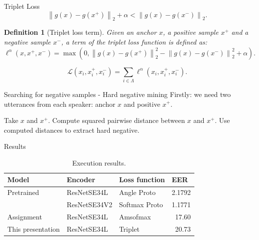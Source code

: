\documentclass[aspectratio=169]{beamer}
\newcommand{\norm}[1]{\left\lVert#1\right\rVert}
\newcommand{\ps}{x^+}
\newcommand{\ns}{x^-}
\newtheorem{defi}{Definition}
\begin{document}
\begin{frame}{Triplet Loss}
  \[
    \norm{g(x) - g(\ps)}_2 + \alpha < \norm{g(x) - g(\ns)}_2.
  \]
  \pause
  \begin{defi}[Triplet loss term]
    Given an anchor \(x\), a positive sample \(\ps\) and a negative sample \(\ns\), a term of the triplet loss function is defined as:
    \begin{equation}\label{triplet:single:loss}
      \ell^\alpha (x,\ps,\ns) = \max \left(0, \norm{g(x) - g(\ps)}_2^2 - \norm{g(x) - g(\ns)}_2^2 + \alpha\right).
    \end{equation}
  \end{defi}

  \begin{equation}\label{triplet:sum:loss}
    \mathcal L (x_i,\ps_i,\ns_i) = \sum_{i \in \Lambda} \ell^\alpha(x_i,\ps_i,\ns_i).
  \end{equation}
\end{frame}


\begin{frame}{Searching for negative samples - Hard negative mining}
  Firstly: we need two utterances from each speaker: anchor \(x\) and positive \(\ps\).
  \begin{algorithm}[H]
    \begin{algorithmic}[1]
      \STATE Take \(x\) and \(\ps\).
      \STATE Compute squared pairwise distance between \(x\) and \(\ps\).
      \STATE Use computed distances to extract hard negative.
      \ENDFOR
    \end{algorithmic}
    \caption{Hard negative mining }
    \label{alg:seq}
  \end{algorithm}

\end{frame}

\begin{frame}{Results}
  \begin{table}[H]
    \begin{tabular}{l|llr}
      Model             & Encoder      & Loss function & \multicolumn{1}{l}{EER}    \\ \hline
      Pretrained        & ResNetSE34L  & Angle Proto   & \multicolumn{1}{l}{2.1792} \\
                        & ResNetSE34V2 & Softmax Proto & 1.1771                     \\
      Assignment        & ResNetSE34L  & Amsofmax      & 17.60                      \\
      This presentation & ResNetSE34L  & Triplet       & 20.73
    \end{tabular}
    \caption{Execution results.}
  \end{table}
\end{frame}
\end{document}
